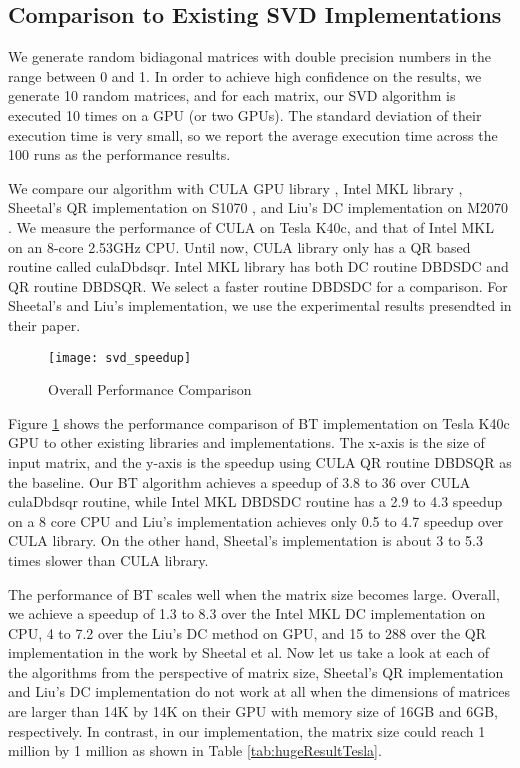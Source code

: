 \subsection{Comparison to Existing SVD Implementations}
We generate random bidiagonal matrices with double precision numbers in the range between 0 and 1.
In order to achieve high confidence on the results, we generate 10 random matrices, and for each matrix, our SVD algorithm is executed 10 times on a GPU (or two GPUs).
The standard deviation of their execution time is very small, so we report the average execution time across the 100 runs as the performance results.

We compare our algorithm with CULA GPU library \cite{cula}, Intel MKL library \cite{mkl}, Sheetal's QR implementation on S1070 \cite{09IPDPSQR}, and Liu's DC implementation on M2070 \cite{13CFDC}.
We measure the performance of CULA on Tesla K40c, and that of Intel MKL on an 8-core 2.53GHz CPU.
Until now, CULA library only has a QR based routine called culaDbdsqr.
Intel MKL library has both DC routine DBDSDC and QR routine DBDSQR. We select a faster routine DBDSDC for a comparison.
For Sheetal's \cite{09IPDPSQR} and Liu's \cite{13CFDC} implementation, we use the experimental results presendted in their paper. 

\begin{figure}[hbpt]
\vspace{-0.3in}
\centering
\texttt{[image: svd\_speedup]}
\vspace{-0.2in}
\caption{Overall Performance Comparison}
\label{fig:svd_speedup}
\vspace{-0.3in}
\end{figure}
Figure \ref{fig:svd_speedup} shows the performance comparison of BT
implementation on Tesla K40c GPU to other existing libraries
and implementations.
The x-axis is the size of input matrix, and the y-axis is the speedup
using CULA QR routine DBDSQR as the baseline.
Our BT algorithm achieves a speedup of 3.8 to 36 over CULA culaDbdsqr routine,
while Intel MKL DBDSDC routine has a 2.9 to 4.3 speedup on a 8 core CPU and Liu's implementation achieves only 0.5 to 4.7 speedup over CULA library.
On the other hand, Sheetal's implementation is about 3 to 5.3 times slower than CULA library.

The performance of BT scales well when the matrix size becomes large.
Overall, we achieve a speedup of 1.3 to 8.3 over the Intel MKL
DC implementation on CPU, 4 to 7.2 over the Liu's
DC method on GPU, and 15 to 288 over the QR implementation in the work by Sheetal et al.
Now let us take a look at each of the algorithms from the perspective of matrix size, Sheetal's QR implementation and Liu's DC implementation do not work at all when the dimensions of matrices are larger than 14K by 14K on their GPU with memory size of 16GB and 6GB, respectively. In contrast, in our implementation, the matrix size could reach 1 million by 1 million as shown in Table \ref{tab:hugeResultTesla}.

